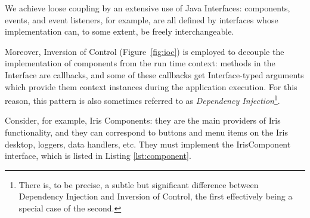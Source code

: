 \documentclass[final,5p]{elsarticle}
\begin{document}
We achieve loose coupling by an extensive use of Java Interfaces: components, events, and event listeners, for example, are all defined by interfaces whose implementation can, to some extent, be freely interchangeable.

Moreover, Inversion of Control (Figure~\ref{fig:ioc}) is employed to decouple the implementation of components from the run time context: methods in the Interface are callbacks, and some of these callbacks get Interface-typed arguments which provide them context instances during the application execution. For this reason, this pattern is also sometimes referred to as \emph{Dependency Injection}\footnote{There is, to be precise, a subtle but significant difference between Dependency Injection and Inversion of Control, the first effectively being a special case of the second.}.

Consider, for example, Iris Components: they are the main providers of Iris functionality, and they can correspond to buttons and menu items on the Iris desktop, loggers, data handlers, etc. They must implement the IrisComponent interface, which is listed in Listing \ref{lst:component}.
\end{document}
